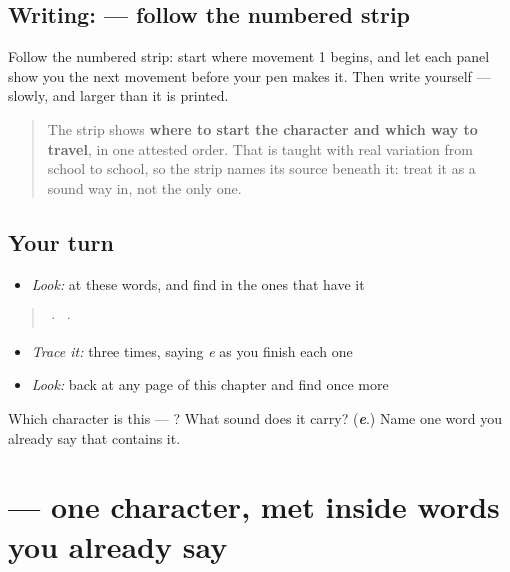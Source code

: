 \subsection*{Writing:  — follow the numbered strip}

Follow the numbered strip: start where movement 1 begins, and let each panel show you the next movement before your pen makes it. Then write  yourself — slowly, and larger than it is printed.

\begin{quote}
The strip shows \textbf{where to start the character and which way to travel}, in one attested order. That is taught with real variation from school to school, so the strip names its source beneath it: treat it as a sound way in, not the only one.
\end{quote}

\subsection*{Your turn}
\begin{itemize}
\raggedright
  \item \emph{Look:} at these words, and find  in the ones that have it
\end{itemize}

\begin{quote}
  ·    ·  
\end{quote}

\begin{itemize}
\raggedright
  \item \emph{Trace it:}  three times, saying \emph{e} as you finish each one
  \item \emph{Look:} back at any page of this chapter and find  once more
\end{itemize}

\begin{tcolorbox}[breakable,colback=teal!4,colframe=teal!35!black,title={Before you move on}]
Which character is this — ? What sound does it carry? (\emph{\textbf{e}}.) Name one word you already say that contains it.
\end{tcolorbox}
\section[\texorpdfstring{\ml{റ} (ṟa)}{റ (ṟa)}]{ — one character, met inside words you already say}

